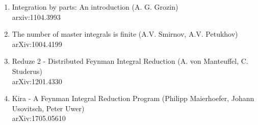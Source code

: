 \documentclass[10pt]{article}
\begin{document}
\begin{enumerate}
\item Integration by parts: An introduction 
(A. G. Grozin)\\
arxiv:1104.3993

\item The number of master integrals is finite
(A.V. Smirnov, A.V. Petukhov)\\
arXiv:1004.4199

\item Reduze 2 - Distributed Feynman Integral Reduction
(A. von Manteuffel, C. Studerus)\\
arXiv:1201.4330

\item Kira - A Feynman Integral Reduction Program
(Philipp Maierhoefer, Johann Usovitsch, Peter Uwer) \\
arXiv:1705.05610
\end{enumerate}
\end{document}
